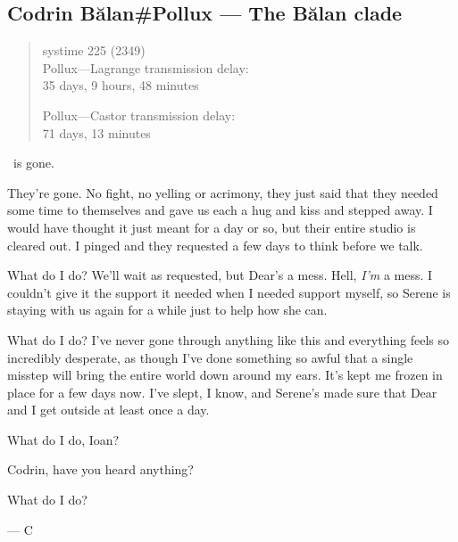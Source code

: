 \hypertarget{codrin-bux103lanpollux-the-bux103lan-clade}{%
\subsection{Codrin Bălan\#Pollux — The Bălan clade}\label{codrin-bux103lanpollux-the-bux103lan-clade}}

\begin{quote}
systime 225 (2349)\\

Pollux---Lagrange transmission delay:\\
35 days, 9 hours, 48 minutes

Pollux---Castor transmission delay:\\
71 days, 13 minutes
\end{quote}

\Partner\ is gone.

They're gone. No fight, no yelling or acrimony, they just said that they needed some time to themselves and gave us each a hug and kiss and stepped away. I would have thought it just meant for a day or so, but their entire studio is cleared out. I pinged and they requested a few days to think before we talk.

What do I do? We'll wait as requested, but Dear's a mess. Hell, \emph{I'm} a mess. I couldn't give it the support it needed when I needed support myself, so Serene is staying with us again for a while just to help how she can.

What do I do? I've never gone through anything like this and everything feels so incredibly desperate, as though I've done something so awful that a single misstep will bring the entire world down around my ears. It's kept me frozen in place for a few days now. I've slept, I know, and Serene's made sure that Dear and I get outside at least once a day.

What do I do, Ioan?

Codrin, have you heard anything?

What do I do?

--- C
